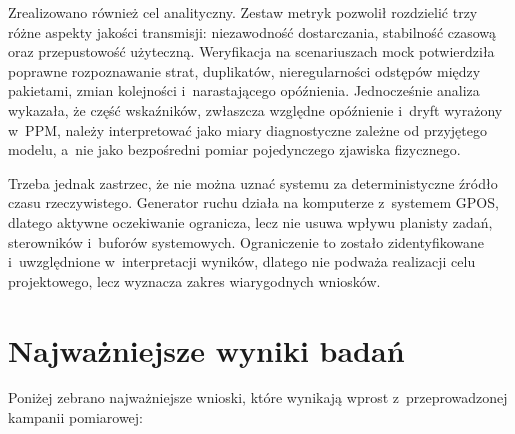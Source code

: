 Zrealizowano również cel analityczny.
Zestaw metryk pozwolił rozdzielić trzy różne aspekty jakości transmisji: niezawodność dostarczania, stabilność czasową oraz przepustowość użyteczną.
Weryfikacja na scenariuszach mock potwierdziła poprawne rozpoznawanie strat, duplikatów, nieregularności odstępów między pakietami, zmian kolejności i~narastającego opóźnienia.
Jednocześnie analiza wykazała, że część wskaźników, zwłaszcza względne opóźnienie i~dryft wyrażony w~PPM, należy interpretować jako miary diagnostyczne zależne od przyjętego modelu, a~nie jako bezpośredni pomiar pojedynczego zjawiska fizycznego.

Trzeba jednak zastrzec, że nie można uznać systemu za deterministyczne źródło czasu rzeczywistego.
Generator ruchu działa na komputerze z~systemem GPOS, dlatego aktywne oczekiwanie ogranicza, lecz nie usuwa wpływu planisty zadań, sterowników i~buforów systemowych.
Ograniczenie to zostało zidentyfikowane i~uwzględnione w~interpretacji wyników, dlatego nie podważa realizacji celu projektowego, lecz wyznacza zakres wiarygodnych wniosków.

\section{Najważniejsze wyniki badań}

Poniżej zebrano najważniejsze wnioski, które wynikają wprost z~przeprowadzonej kampanii pomiarowej:

